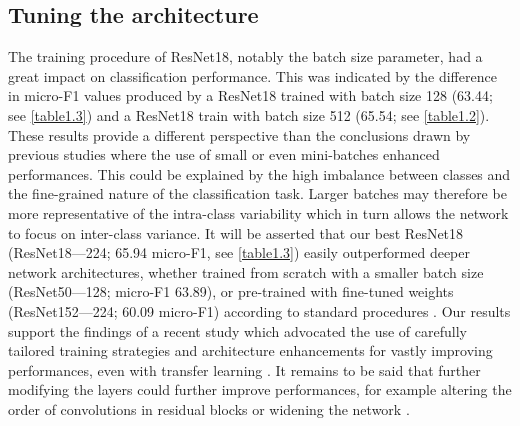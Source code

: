\subsection{Tuning the architecture}\label{chapitre1_7.2}
The training procedure of ResNet18, notably the batch size parameter, had a great impact on classification performance. This was indicated by the difference in micro-F1 values produced by a ResNet18 trained with batch size 128 (63.44; see \autoref{table1.3}) and a ResNet18 train with batch size 512 (65.54; see \autoref{table1.2}). These results provide a different perspective than the conclusions drawn by previous studies \citep{masters_revisiting_2018, mishkin_systematic_2016} where the use of small or even mini-batches enhanced performances. This could be explained by the high imbalance between classes and the fine-grained nature of the classification task. Larger batches may therefore be more representative of the intra-class variability which in turn allows the network to focus on inter-class variance. It will be asserted that our best ResNet18 (ResNet18---224; 65.94 micro-F1, see \autoref{table1.3}) easily outperformed deeper network architectures, whether trained from scratch with a smaller batch size (ResNet50---128; micro-F1 63.89), or pre-trained with fine-tuned weights (ResNet152---224; 60.09 micro-F1) according to standard procedures \citep{king_comparison_2018}. Our results support the findings of a recent study which advocated the use of carefully tailored training strategies and architecture enhancements for vastly improving performances, even with transfer learning \citep{he_bag_2019}. It remains to be said that further modifying the layers could further improve performances, for example altering the order of convolutions in residual blocks \citep{he_bag_2019} or widening the network \citep{zagoruyko_wide_2016}.

